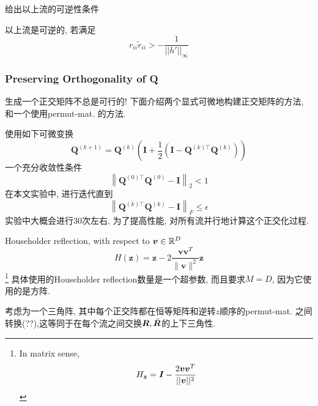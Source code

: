 \documentclass{article}
\begin{document}
给出以上流的可逆性条件
\begin{theorem}
    以上流是可逆的, 若满足
    $$
    r_{ii}\tilde r_{ii} > -\frac{1}{||h'||_\infty}
    $$
\end{theorem}

\subsubsection{Preserving Orthogonality of Q}

生成一个正交矩阵不总是可行的! 下面介绍两个显式可微地构建正交矩阵的方法, 和一个使用permut-mat. 的方法.

 使用如下可微变换
\begin{equation}
    \mathbf{Q}^{(k+1)}=\mathbf{Q}^{(k)}\left(\mathbf{I}+\frac{1}{2}\left(\mathbf{I}-\mathbf{Q}^{(k) \top} \mathbf{Q}^{(k)}\right)\right)
\end{equation}
一个充分收敛性条件
\begin{equation}
    \left\|\mathbf{Q}^{(0) \top} \mathbf{Q}^{(0)}-\mathbf{I}\right\|_{2}<1
\end{equation}
在本文实验中, 进行迭代直到
\begin{equation}
    \left\|\mathbf{Q}^{(k) \top} \mathbf{Q}^{(k)}-\mathbf{I}\right\|_{F} \leq \epsilon
\end{equation}
实验中大概会进行30次左右, 为了提高性能, 对所有流并行地计算这个正交化过程.


Householder reflection, with respect to $\boldsymbol{v}\in \mathbb{R}^D$
\begin{equation}
    H(\mathbf{z})=\mathbf{z}-2 \frac{\mathbf{v} \mathbf{v}^{T}}{\|\mathbf{v}\|^{2}} \mathbf{z}
\end{equation}\footnote{
    In matrix sense, \begin{equation}
        H_{\boldsymbol{z}}=\boldsymbol{I}-\frac{2\boldsymbol{v} \boldsymbol{v}^T}{||\boldsymbol{v}||^2}
    \end{equation}
}
具体使用的Householder reflection数量是一个超参数, 而且要求$M=D$, 因为它使用的是方阵.


考虑为一个三角阵, 其中每个正交阵都在恒等矩阵和逆转$z$顺序的permut-mat. 之间转换(??),这等同于在每个流之间交换$\boldsymbol{R}, \tilde{\boldsymbol{R}}$的上下三角性.
\end{document}
